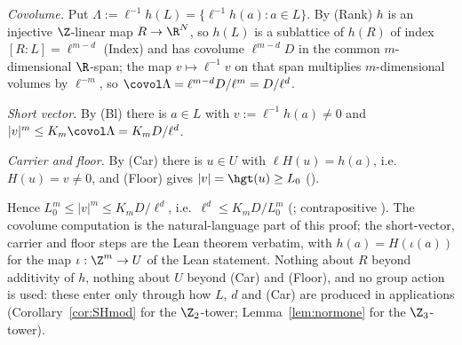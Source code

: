 \emph{Covolume.} Put $\Lambda:=\ell^{-1}h(L)=\{\ell^{-1}h(a):a\in L\}$. By (Rank) $h$ is an injective $\Z$-linear map $R\to\R^N$, so $h(L)$ is a sublattice of $h(R)$ of index $[R:L]=\ell^{m-d}$ (Index) and has covolume $\ell^{m-d}D$ in the common $m$-dimensional $\R$-span; the map $v\mapsto\ell^{-1}v$ on that span multiplies $m$-dimensional volumes by $\ell^{-m}$, so $\covol\Lambda=\ell^{m-d}D/\ell^m=D/\ell^{d}$.

\emph{Short vector.} By (Bl) there is $a\in L$ with $v:=\ell^{-1}h(a)\ne0$ and $|v|^m\le K_m\covol\Lambda=K_mD/\ell^{d}$.

\emph{Carrier and floor.} By (Car) there is $u\in U$ with $\ell H(u)=h(a)$, i.e.\ $H(u)=v\ne0$, and (Floor) gives $|v|=\hgt(u)\ge L_0$ ().

Hence $L_0^m\le|v|^m\le K_mD/\ell^{d}$, i.e.\ $\ell^{d}\le K_mD/L_0^{m}$ (; contrapositive ). The covolume computation is the natural-language part of this proof; the short-vector, carrier and floor steps are the Lean theorem verbatim, with $h(a)=H(\iota(a))$ for the map $\iota:\Z^m\to U$ of the Lean statement. Nothing about $R$ beyond additivity of $h$, nothing about $U$ beyond (Car) and (Floor), and no group action is used: these enter only through how $L$, $d$ and (Car) are produced in applications (Corollary~\ref{cor:SHmod} for the $\Z_2$-tower; Lemma~\ref{lem:normone} for the $\Z_3$-tower).
